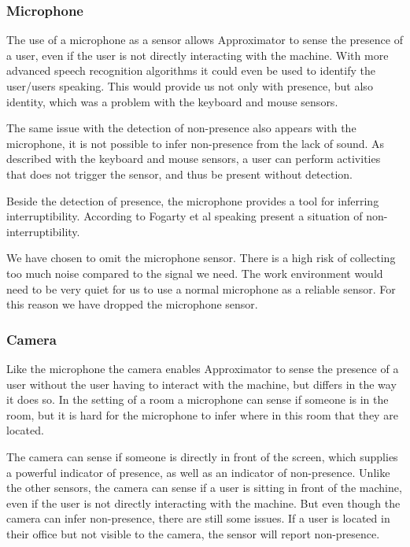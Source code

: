\documentclass{sigchi}
\begin{document}
\subsubsection{Microphone}
The use of a microphone as a sensor allows Approximator to sense the presence of a user, even if the user is not directly interacting with the machine.
With more advanced speech recognition algorithms it could even be used to identify the user/users speaking.
This would provide us not only with presence, but also identity, which was a problem with the keyboard and mouse sensors.

The same issue with the detection of non-presence also appears with the microphone, it is not possible to infer non-presence from the lack of sound.
As described with the keyboard and mouse sensors, a user can perform activities that does not trigger the sensor, and thus be present without detection.

Beside the detection of presence, the microphone provides a tool for inferring interruptibility.
According to Fogarty et al\cite{fogarty2005predicting} speaking present a situation of non-interruptibility.

We have chosen to omit the microphone sensor.
There is a high risk of collecting too much noise compared to the signal we need.
The work environment would need to be very quiet for us to use a normal microphone as a reliable sensor.
For this reason we have dropped the microphone sensor.

\subsubsection{Camera}
Like the microphone the camera enables Approximator to sense the presence of a user without the user having to interact with the machine, but differs in the way it does so.
In the setting of a room a microphone can sense if someone is in the room, but it is hard for the microphone to infer where in this room that they are located.

The camera can sense if someone is directly in front of the screen, which supplies a powerful indicator of presence, as well as an indicator of non-presence.
Unlike the other sensors, the camera can sense if a user is sitting in front of the machine, even if the user is not directly interacting with the machine.
But even though the camera can infer non-presence, there are still some issues.
If a user is located in their office but not visible to the camera, the sensor will report non-presence.
\end{document}
